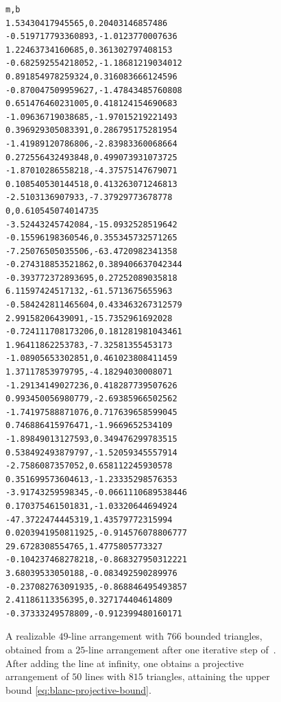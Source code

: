 \begin{figure}[!hp]
\centering
{}\label{tab:45-coefficients}
\small
\begin{verbatim}
m,b
1.53430417945565,0.20403146857486
-0.519717793360893,-1.0123770007636
1.22463734160685,0.361302797408153
-0.682592554218052,-1.18681219034012
0.891854978259324,0.316083666124596
-0.870047509959627,-1.47843485760808
0.651476460231005,0.418124154690683
-1.09636719038685,-1.97015219221493
0.396929305083391,0.286795175281954
-1.41989120786806,-2.83983360068664
0.272556432493848,0.499073931073725
-1.87010286558218,-4.37575147679071
0.108540530144518,0.413263071246813
-2.5103136907933,-7.37929773678778
0,0.610545074014735
-3.52443245742084,-15.0932528519642
-0.15596198360546,0.355345732571265
-7.25076505035506,-63.4720982341358
-0.274318853521862,0.389406637042344
-0.393772372893695,0.27252089035818
6.11597424517132,-61.5713675655963
-0.584242811465604,0.433463267312579
2.99158206439091,-15.7352961692028
-0.724111708173206,0.181281981043461
1.96411862253783,-7.32581355453173
-1.08905653302851,0.461023808411459
1.37117853979795,-4.18294030008071
-1.29134149027236,0.418287739507626
0.993450056980779,-2.69385966502562
-1.74197588871076,0.717639658599045
0.746886415976471,-1.9669652534109
-1.89849013127593,0.349476299783515
0.538492493879797,-1.52059345557914
-2.7586087357052,0.658112245930578
0.351699573604613,-1.23335298576353
-3.91743259598345,-0.0661110689538446
0.170375461501831,-1.03320644694924
-47.3722474445319,1.43579772315994
0.0203941950811925,-0.914576078806777
29.6728308554765,1.4775805773327
-0.104237468278218,-0.868327950312221
3.68039533050188,-0.083492590289976
-0.237082763091935,-0.868846495493857
2.41186113356395,0.327174404614809
-0.37333249578809,-0.912399480160171
\end{verbatim}
\end{figure}

\begin{figure}[!hp]
\centering

\caption{A realizable $49$-line arrangement with $766$ bounded triangles, obtained
from a $25$-line arrangement after one iterative step of~\cite{forge1998}.
After adding the line at infinity, one obtains a projective arrangement of
$50$ lines with $815$ triangles, attaining the upper bound
\eqref{eq:blanc-projective-bound}.}
\label{fig:49-from-25-lines}
\end{figure}

